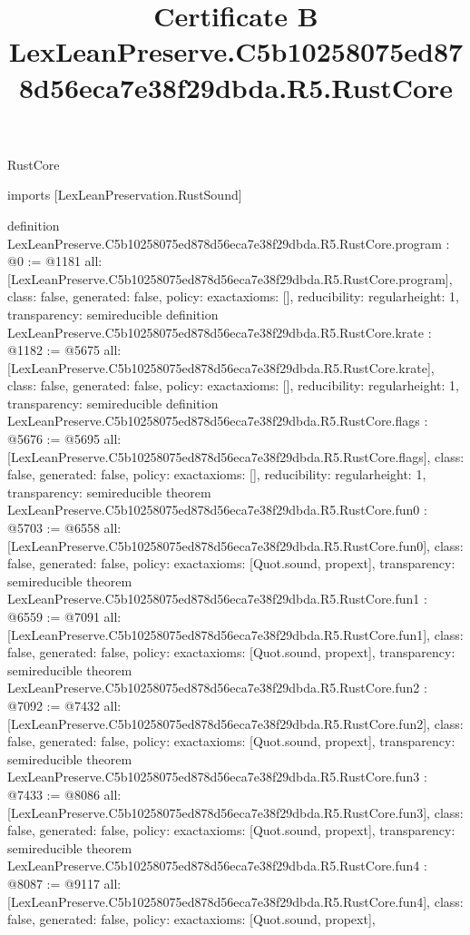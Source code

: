 \begin{lexlean}{RustCore}
\title{Certificate B LexLeanPreserve.C5b10258075ed878d56eca7e38f29dbda.R5.RustCore}
\begin{coremodule}
imports [LexLeanPreservation.RustSound]

definition LexLeanPreserve.C5b10258075ed878d56eca7e38f29dbda.R5.RustCore.program : @0 := @1181 {
  all: [LexLeanPreserve.C5b10258075ed878d56eca7e38f29dbda.R5.RustCore.program],
  class: false,
  generated: false,
  policy: exact{axioms: []},
  reducibility: regular{height: 1},
  transparency: semireducible
}
definition LexLeanPreserve.C5b10258075ed878d56eca7e38f29dbda.R5.RustCore.krate : @1182 := @5675 {
  all: [LexLeanPreserve.C5b10258075ed878d56eca7e38f29dbda.R5.RustCore.krate],
  class: false,
  generated: false,
  policy: exact{axioms: []},
  reducibility: regular{height: 1},
  transparency: semireducible
}
definition LexLeanPreserve.C5b10258075ed878d56eca7e38f29dbda.R5.RustCore.flags : @5676 := @5695 {
  all: [LexLeanPreserve.C5b10258075ed878d56eca7e38f29dbda.R5.RustCore.flags],
  class: false,
  generated: false,
  policy: exact{axioms: []},
  reducibility: regular{height: 1},
  transparency: semireducible
}
theorem LexLeanPreserve.C5b10258075ed878d56eca7e38f29dbda.R5.RustCore.fun0 : @5703 := @6558 {
  all: [LexLeanPreserve.C5b10258075ed878d56eca7e38f29dbda.R5.RustCore.fun0],
  class: false,
  generated: false,
  policy: exact{axioms: [Quot.sound, propext]},
  transparency: semireducible
}
theorem LexLeanPreserve.C5b10258075ed878d56eca7e38f29dbda.R5.RustCore.fun1 : @6559 := @7091 {
  all: [LexLeanPreserve.C5b10258075ed878d56eca7e38f29dbda.R5.RustCore.fun1],
  class: false,
  generated: false,
  policy: exact{axioms: [Quot.sound, propext]},
  transparency: semireducible
}
theorem LexLeanPreserve.C5b10258075ed878d56eca7e38f29dbda.R5.RustCore.fun2 : @7092 := @7432 {
  all: [LexLeanPreserve.C5b10258075ed878d56eca7e38f29dbda.R5.RustCore.fun2],
  class: false,
  generated: false,
  policy: exact{axioms: [Quot.sound, propext]},
  transparency: semireducible
}
theorem LexLeanPreserve.C5b10258075ed878d56eca7e38f29dbda.R5.RustCore.fun3 : @7433 := @8086 {
  all: [LexLeanPreserve.C5b10258075ed878d56eca7e38f29dbda.R5.RustCore.fun3],
  class: false,
  generated: false,
  policy: exact{axioms: [Quot.sound, propext]},
  transparency: semireducible
}
theorem LexLeanPreserve.C5b10258075ed878d56eca7e38f29dbda.R5.RustCore.fun4 : @8087 := @9117 {
  all: [LexLeanPreserve.C5b10258075ed878d56eca7e38f29dbda.R5.RustCore.fun4],
  class: false,
  generated: false,
  policy: exact{axioms: [Quot.sound, propext]},
}
\end{coremodule}
\end{lexlean}
